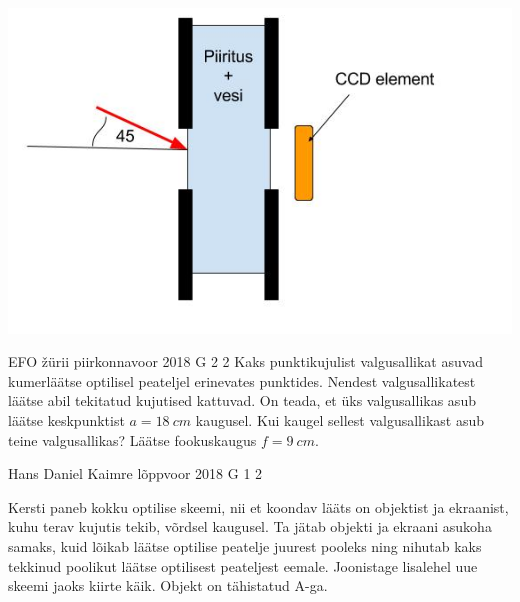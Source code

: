 \documentclass[11pt]{article}
\begin{document}
{{\begin{center}
	\vspace{-0pt}
	\includegraphics[width=0.5\linewidth]{2017-v2g-04-Piiritusetehas.jpg}
	\vspace{-10pt}
\end{center}
\fi
}

{EFO žürii} %
{piirkonnavoor} %
{2018} %
{G 2} %
{2} %
{
\ifStatement
Kaks punktikujulist valgusallikat asuvad kumerläätse optilisel peateljel erinevates punktides. Nendest valgusallikatest läätse abil tekitatud kujutised kattuvad. On teada, et üks valgusallikas asub läätse keskpunktist $a=\SI{18}{cm}$ kaugusel. Kui kaugel sellest valgusallikast asub teine valgusallikas? Läätse fookuskaugus $f=\SI{9}{cm}$. 
\fi
}

{Hans Daniel Kaimre} %
{lõppvoor} %
{2018} %
{G 1} %
{2} %
{
\ifStatement
Kersti paneb kokku optilise skeemi, nii et koondav lääts on objektist ja ekraanist, kuhu terav kujutis tekib, võrdsel kaugusel. Ta jätab objekti ja ekraani asukoha samaks, kuid lõikab läätse optilise peatelje juurest pooleks ning nihutab kaks tekkinud poolikut läätse optilisest peateljest eemale. Joonistage lisalehel uue skeemi jaoks kiirte käik. Objekt on tähistatud A-ga.
\begin{center}
\end{center}}}
\end{document}
